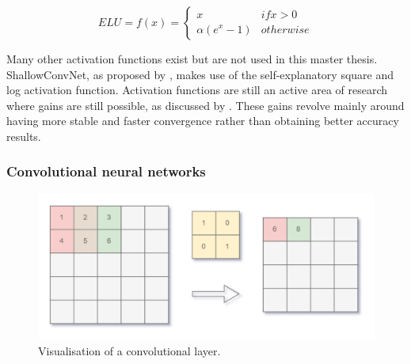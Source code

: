 \begin{equation}
    \label{eq:elu}
    ELU = f(x) = \begin{cases}
        x  & if x > 0 \\
        \alpha(e^x -1) & otherwise
      \end{cases}
\end{equation}

Many other activation functions exist but are not used in this master thesis.
ShallowConvNet, as proposed by \citet{eeg_model_hbm}, makes use of the self-explanatory square and log activation function.
Activation functions are still an active area of research where gains are still possible, as discussed by \citet{rl_activation_function_compare}.
These gains revolve mainly around having more stable and faster convergence rather than obtaining better accuracy results.




\subsubsection{Convolutional neural networks}
\label{subsubsec:processing_signals_ml_and_dl_dl_classifiers_cnn}

\begin{figure}[t]
    \centering
    \includegraphics[width=\linewidth]{../images/pipeline/cnn.pdf}
    \captionsetup{width=0.8\linewidth}
    \captionsetup{justification=centering}
    \caption{Visualisation of a convolutional layer.}
    \label{fig:processing_signals_cnn}
\end{figure}


